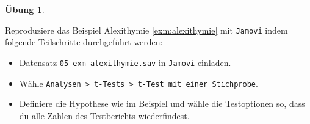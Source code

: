 \documentclass[
]{book}
\providecommand{\tightlist}{%
  \setlength{\itemsep}{0pt}\setlength{\parskip}{0pt}}
\theoremstyle{definition}
\theoremstyle{definition}
\theoremstyle{definition}
\newtheorem{exercise}{Übung}[chapter]
\theoremstyle{definition}
\theoremstyle{remark}
\begin{document}
\begin{exercise}
\protect\hypertarget{exr:alexithymie}{}\label{exr:alexithymie}\leavevmode

Reproduziere das Beispiel Alexithymie \ref{exm:alexithymie} mit \texttt{Jamovi} indem folgende Teilschritte durchgeführt werden:

\begin{itemize}
\tightlist
\item
  Datensatz \texttt{05-exm-alexithymie.sav} in \texttt{Jamovi} einladen.
\item
  Wähle \texttt{Analysen\ \textgreater{}\ t-Tests\ \textgreater{}\ t-Test\ mit\ einer\ Stichprobe}.
\item
  Definiere die Hypothese wie im Beispiel und wähle die Testoptionen so, dass du alle Zahlen des Testberichts wiederfindest.
\end{itemize}

\end{exercise}
\end{document}
